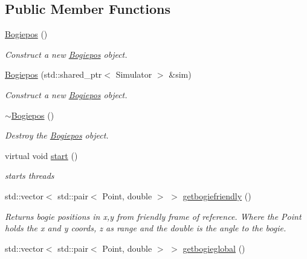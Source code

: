 \subsection*{Public Member Functions}
\begin{DoxyCompactItemize}
\item 
\hyperlink{classBogiepos_ad5db58b0f0ad66be505851ea9514d579}{Bogiepos} ()
\begin{DoxyCompactList}\small\item\em Construct a new \hyperlink{classBogiepos}{Bogiepos} object. \end{DoxyCompactList}\item 
\hyperlink{classBogiepos_a658f927c4ae34b41c7bd08b6a448b9cb}{Bogiepos} (std\+::shared\+\_\+ptr$<$ Simulator $>$ \&sim)
\begin{DoxyCompactList}\small\item\em Construct a new \hyperlink{classBogiepos}{Bogiepos} object. \end{DoxyCompactList}\item 
\mbox{\label{classBogiepos_a6b1a0d5c052e6d4af5d1f55cd815ef7c}} 
\hyperlink{classBogiepos_a6b1a0d5c052e6d4af5d1f55cd815ef7c}{$\sim$\+Bogiepos} ()
\begin{DoxyCompactList}\small\item\em Destroy the \hyperlink{classBogiepos}{Bogiepos} object. \end{DoxyCompactList}\item 
\mbox{\label{classBogiepos_a25b918db7e3b9b403d202216ddba636b}} 
virtual void \hyperlink{classBogiepos_a25b918db7e3b9b403d202216ddba636b}{start} ()
\begin{DoxyCompactList}\small\item\em starts threads \end{DoxyCompactList}\item 
std\+::vector$<$ std\+::pair$<$ Point, double $>$ $>$ \hyperlink{classBogiepos_a513a373b97583009e8f6c2e487ba5b3a}{getbogiefriendly} ()
\begin{DoxyCompactList}\small\item\em Returns bogie positions in x,y from friendly frame of reference. Where the Point holds the x and y coords, z as range and the double is the angle to the bogie. \end{DoxyCompactList}\item 
std\+::vector$<$ std\+::pair$<$ Point, double $>$ $>$ \hyperlink{classBogiepos_abf7b5d2b2d099e51bfb46b1aaf8c797e}{getbogieglobal} ()

\end{DoxyCompactItemize}
